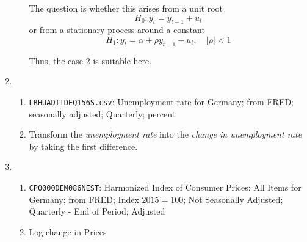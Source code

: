 \begin{enumerate}[label=--]
\begin{enumerate}[label=(\roman*)]
\begin{sol}
                        The question is whether this arises from a unit root
                        \[ H_0: y_t = y_{t-1} + u_t \]
                        or from a stationary process around a constant
                        \[
                            H_1: y_t = \alpha + \rho y_{t-1} + u_t,
                            \quad |\rho| < 1
                        \]

                        Thus, the case 2 is suitable here.
                    \end{sol}
          \end{enumerate}

    \item \begin{enumerate}[label=(\roman*)]
              \item \verb|LRHUADTTDEQ156S.csv|: Unemployment rate for Germany; from FRED; seasonally adjusted; Quarterly; percent

              \item Transform the \emph{unemployment rate} into the \emph{change in unemployment rate} by taking the first difference.
          \end{enumerate}

    \item \begin{enumerate}[label=(\roman*)]
              \item \verb|CP0000DEM086NEST|: Harmonized Index of Consumer Prices: All Items for Germany; from FRED; Index $2015=100$; Not Seasonally Adjusted; Quarterly - End of Period; Adjusted

              \item Log change in Prices
          \end{enumerate}
\end{enumerate}

\begin{sol}
    
\end{sol}